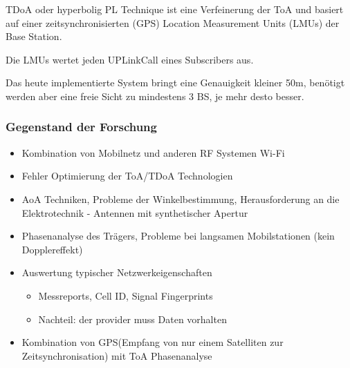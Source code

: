 TDoA oder hyperbolig PL Technique ist eine Verfeinerung der ToA und basiert auf einer zeitsynchronisierten (GPS) Location Measurement Units (LMUs) der Base Station.

Die LMUs wertet jeden UPLinkCall eines Subscribers aus. 

Das heute implementierte System bringt eine Genauigkeit kleiner 50m, benötigt werden aber eine freie Sicht zu mindestens 3 BS, je mehr desto besser. 

\subsubsection{Gegenstand der Forschung}
\begin{itemize}
\item Kombination von Mobilnetz und anderen RF Systemen Wi-Fi
\item Fehler Optimierung der ToA/TDoA Technologien
\item AoA Techniken, Probleme der Winkelbestimmung, Herausforderung an die Elektrotechnik - Antennen mit synthetischer Apertur
\item Phasenanalyse des Trägers, Probleme bei langsamen Mobilstationen (kein Dopplereffekt)
\item Auswertung typischer Netzwerkeigenschaften
\begin{itemize}
\item Messreports, Cell ID, Signal Fingerprints
\item Nachteil: der provider muss Daten vorhalten
\end{itemize}
\item Kombination von GPS(Empfang von nur einem Satelliten zur Zeitsynchronisation) mit ToA Phasenanalyse
\end{itemize}